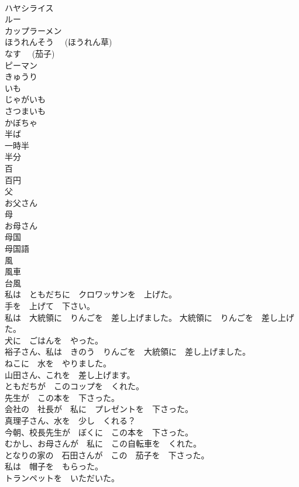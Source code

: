 \documentclass[8pt]{extreport}
\begin{document}
\begin{CJK}{UTF8}{min}
\\	ハヤシライス	
\\	ルー	
\\	カップラーメン	
\\	ほうれんそう　 (ほうれん草)	
\\	なす　 (茄子)	
\\	ピーマン	
\\	きゅうり	
\\	いも	
\\	じゃがいも	
\\	さつまいも	
\\	かぼちゃ	
\\	半ば	
\\	一時半	
\\	半分	
\\	百	
\\	百円	
\\	父	
\\	お父さん	
\\	母	
\\	お母さん	
\\	母国	
\\	母国語	
\\	風	
\\	風車	
\\	台風	
\\	私は　ともだちに　クロワッサンを　上げた。	
\\	手を　上げて　下さい。	
\\	私は　大統領に　りんごを　差し上げました。 大統領に　りんごを　差し上げた。	
\\	犬に　ごはんを　やった。	
\\	裕子さん、私は　きのう　りんごを　大統領に　差し上げました。	
\\	ねこに　水を　やりました。	
\\	山田さん、これを　差し上げます。	
\\	ともだちが　このコップを　くれた。	
\\	先生が　この本を　下さった。	
\\	会社の　社長が　私に　プレゼントを　下さった。	
\\	真理子さん、水を　少し　くれる？	
\\	今朝、校長先生が　ぼくに　この本を　下さった。	
\\	むかし、お母さんが　私に　この自転車を　くれた。	
\\	となりの家の　石田さんが　この　茄子を　下さった。	
\\	私は　帽子を　もらった。	
\\	トランペットを　いただいた。	

\end{CJK}
\end{document}
